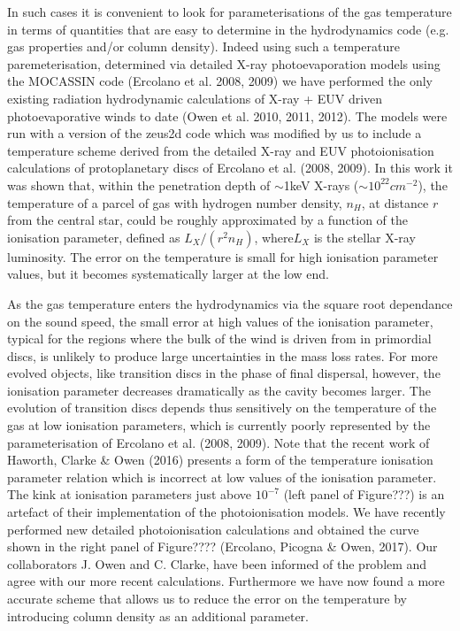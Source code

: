 \documentclass[10pt,fleqn,twoside]{article}
\begin{document}
In such cases it is convenient to look for parameterisations of the
gas temperature in terms of quantities that are easy to determine in
the hydrodynamics code (e.g. gas properties and/or column density). 
Indeed using such a temperature paremeterisation,
determined via detailed X-ray photoevaporation models using the
MOCASSIN code (Ercolano et al. 2008, 2009) we have performed the
only existing radiation hydrodynamic 
calculations of X-ray + EUV driven photoevaporative winds to date (Owen et
al. 2010, 2011, 2012). The models were run with a version of the {\sc
  zeus2d} code which was modified by us to include a temperature
scheme derived from the detailed X-ray and EUV photoionisation
calculations of protoplanetary discs of Ercolano et al. (2008,
2009). In this work it was shown that, within the
penetration depth of $\sim$1keV X-rays ($\sim 10^{22}cm^{-2}$), the
temperature of a parcel of gas with hydrogen number density, $n_H$, at
distance $r$ from the central star, could be roughly approximated by a
function of the ionisation parameter, defined as $L_X/(r^2 n_H)$,
where$L_X$ is the stellar X-ray luminosity. The error on the
temperature is small for high ionisation parameter values, but it
becomes systematically larger at the low end. 

As the gas temperature enters the hydrodynamics via the square root
dependance on the sound speed, the small error at high values of the
ionisation parameter, typical for the regions where the bulk of the
wind is driven from in primordial discs, is unlikely to produce large
uncertainties in the mass loss rates. For more evolved objects, like
transition discs in the phase of final dispersal, however, the ionisation
parameter decreases dramatically as the cavity becomes larger. The
evolution of transition discs depends thus sensitively on the temperature
of the gas at low ionisation parameters, which is currently poorly
represented by the parameterisation of Ercolano et al. (2008, 2009). 
Note that the recent work of Haworth, Clarke \& Owen (2016) presents a
form of the temperature ionisation parameter relation which is incorrect at
low values of the ionisation parameter. The kink at ionisation
parameters just above $10^{-7}$ (left panel of Figure???) is an artefact of their implementation
of the photoionisation models. We have recently performed new detailed
photoionisation calculations and obtained the curve shown in the right
panel of Figure???? (Ercolano, Picogna \& Owen, 2017). Our
collaborators J. Owen and C. Clarke, have been informed of the problem
and agree with our more recent calculations. Furthermore we have now
found a more accurate scheme that allows us to reduce the error on the
temperature by introducing  column density as an additional
parameter. 
\end{document}
